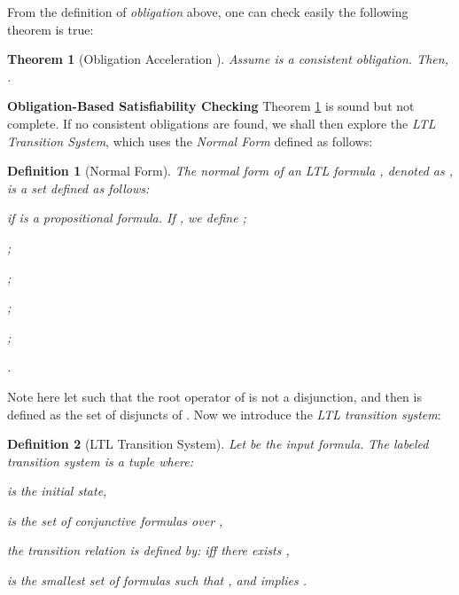\documentclass[conference]{IEEEtran}
\newtheorem{definition}{Definition}
\newtheorem{theorem}{Theorem}
\begin{document}
From the definition of \textit{obligation} above, one can check easily the following theorem 
is true:
\begin{theorem}[Obligation Acceleration \cite{LZPVH13}]\label{thm:oa}
  Assume  is a consistent obligation. Then,
  .
\end{theorem}

\noindent
\textbf{Obligation-Based Satisfiability Checking}
Theorem \ref{thm:oa} is sound but not complete. If no consistent
obligations are found, we shall then explore the \textit{LTL
  Transition System}, which uses the \textit{Normal Form} defined as
follows:

\begin{definition}[Normal Form]\label{def:expansion}
  The \textit{normal form} of an LTL formula , denoted as
  , is a set defined as follows:
\begin{compactenum}
\item  if  is a
  propositional formula. If , we define ;
\item ;
\item ;
\item ;
\item ;
\item .
\end{compactenum}
\end{definition}

Note here let  such that the root
operator of  is not a disjunction, and then  
is defined as the set of
disjuncts of . Now we introduce the \textit{LTL transition system}:

\begin{definition}[LTL Transition System]\label{def:lts}
  Let  be the input formula. The
  labeled transition system  is a tuple  where: 
  
  \iffalse
  1).  is the initial state; 
  2).  is the set of conjunctive formulas over ; 
  3). the transition relation  is defined by:
     iff there exists ; and 4).  is the smallest set of formulas such that , and  implies
  .
  \fi
  \begin{compactenum}
  \item   is the initial state, 
  \item  is the set of conjunctive formulas over ,
 \item the transition relation  is defined by:
     iff there exists ,
\item  is the smallest set of formulas such that , and  implies
  .
  \end{compactenum}
\end{definition}
\end{document}
